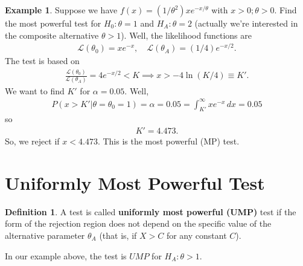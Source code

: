 \documentclass{book}
\theoremstyle{definition}
\newtheorem{defn}{Definition}[section]
\newtheorem{exmp}{Example}[section]
\newcommand{\lag}{\mathcal{L}}
\newcommand{\al}{\alpha}
\newcommand{\f}[2]{\frac{#1}{#2}}
\begin{document}
\begin{exmp}
	Suppose we have $f(x) = (1/\theta^2)x e^{-x/\theta}$ with $x>0; \theta > 0$. Find the most powerful test for $H_0 : \theta = 1$ and $H_A: \theta = 2$ (actually we're interested in the composite alternative $\theta > 1$). Well, the likelihood functions are
	\begin{align}
	\lag(\theta_0)  =x e^{-x}, \quad \lag(\theta_A) = (1/4)e^{-x/2}. 
	\end{align} 
	The test is based on 
	\begin{align}
	\f{\lag(\theta_0)}{\lag(\theta_A)} = 4e^{-x/2} < K \implies  x > -4\ln (K/4) \equiv K'.
	\end{align}
	We want to find $K'$ for $\al = 0.05$. Well,
	\begin{align}
	P(x > K' \vert \theta = \theta_0 = 1) = \alpha = 0.05  = \int^\infty_{K'}xe^{-x}\,dx = 0.05
	\end{align}
	so
	\begin{align}
	K' = 4.473.
	\end{align}
	So, we reject if $x < 4.473$. This is the most powerful (MP) test. 
\end{exmp}



\section{Uniformly Most Powerful Test}

\begin{defn}
A test is called \textbf{uniformly most powerful (UMP)} test if the form of the rejection region does not depend on the specific value of the alternative parameter $\theta_A$ (that is, if $X > C$ for any constant $C$). 
\end{defn}


In our example above, the test is $UMP$ for $H_A : \theta > 1$.
\end{document}
